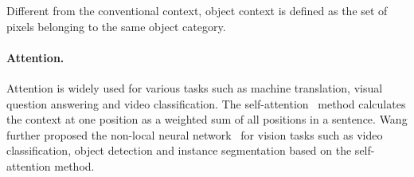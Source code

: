 \documentclass[10pt,twocolumn,letterpaper]{article}
\begin{document}
Different from the conventional context, object context is defined as the set of pixels belonging to the same object category.


\paragraph{Attention.}
Attention is widely used for various tasks such as machine translation, visual question answering and video classification.
The self-attention~\cite{lin2017structured,vaswani2017attention} method calculates the context at one position as a weighted sum of all positions in a sentence.
Wang \etal  further proposed the non-local neural network~\cite{wang2018non} for vision tasks such as video classification, object detection and instance segmentation based on the self-attention method.
\end{document}
